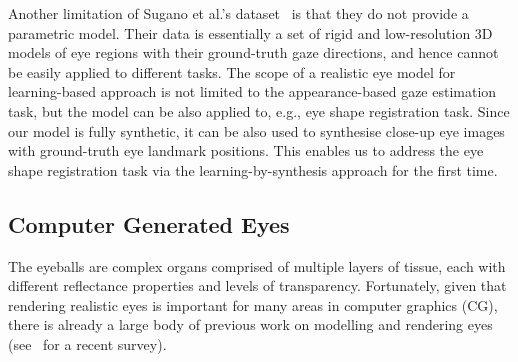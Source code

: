 Another limitation of Sugano et al.'s dataset~\cite{sugano2014learning} is that they do not provide a parametric model.
Their data is essentially a set of rigid and low-resolution 3D models of eye regions with their ground-truth gaze directions, and hence cannot be easily applied to different tasks.
The scope of a realistic eye model for learning-based approach is not limited to the appearance-based gaze estimation task, but the model can be also applied to, e.g., eye shape registration task.
Since our model is fully synthetic, it can be also used to synthesise close-up eye images with ground-truth eye landmark positions.
This enables us to address the eye shape registration task via the learning-by-synthesis approach for the first time.



\subsection{Computer Generated Eyes}

\cite{ruhland2014look}


The eyeballs are complex organs comprised of multiple layers of tissue, each with different reflectance properties and levels of transparency.
Fortunately, given that rendering realistic eyes is important for many areas in computer graphics (CG), there is already a large body of previous work on modelling and rendering eyes (see~\cite{ruhland2014look} for a recent survey).

